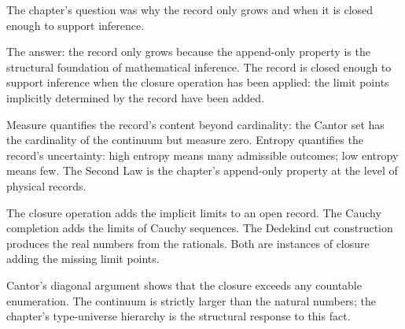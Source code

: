 \begin{bridge}

The chapter's question was why the record only grows and when it is
closed enough to support inference.

The answer: the record only grows because the append-only property
is the structural foundation of mathematical inference. The record
is closed enough to support inference when the closure operation
has been applied: the limit points implicitly determined by the
record have been added.

Measure quantifies the record's content beyond cardinality: the
Cantor set has the cardinality of the continuum but measure zero.
Entropy quantifies the record's uncertainty: high entropy means
many admissible outcomes; low entropy means few. The Second Law
is the chapter's append-only property at the level of physical
records.

The closure operation adds the implicit limits to an open record.
The Cauchy completion adds the limits of Cauchy sequences. The
Dedekind cut construction produces the real numbers from the
rationals. Both are instances of closure adding the missing limit
points.

Cantor's diagonal argument shows that the closure exceeds any
countable enumeration. The continuum is strictly larger than the
natural numbers; the chapter's type-universe hierarchy is the
structural response to this fact.

\end{bridge}

